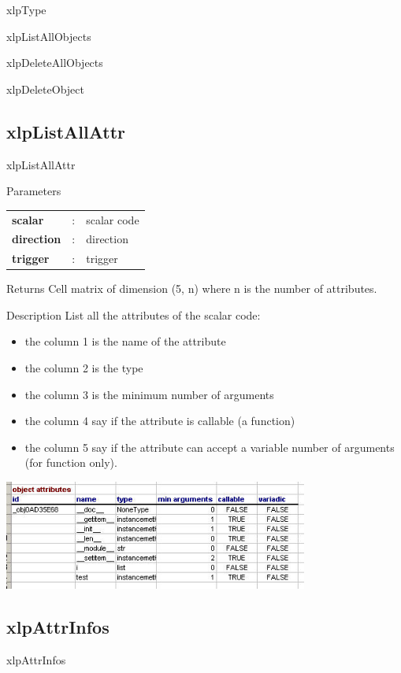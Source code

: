 \begin{xlpfunctitle}{xlpType}
\begin{xlpfunctitle}{xlpListAllObjects}
\begin{xlpfunctitle}{xlpDeleteAllObjects}
\begin{xlpfunctitle}{xlpDeleteObject}
\subsection{xlpListAllAttr}

\begin{xlpfunctitle}{xlpListAllAttr}

\begin{xlpfunc}{Parameters}
\begin{tabular}{p{3.5cm}cl}
\textbf{scalar}& : & scalar code \\
\textbf{direction}& : & direction \\
\textbf{trigger}& : & trigger 
\end{tabular}
\end{xlpfunc}


\begin{xlpfunc}{Returns}
Cell matrix of dimension (5, n) where n is the number of attributes.
\end{xlpfunc}

\begin{xlpfunc}{Description}
List all the attributes of the scalar code:
\begin{itemize}
\item the column 1 is the name of the attribute 
\item the column 2 is the type
\item the column 3 is the minimum number of arguments
\item the column 4 say if the attribute is callable (a function)
\item the column 5 say if the attribute can accept a variable number of arguments (for function only).
\end{itemize}
\includegraphics[width=10cm]{images/listallattr.jpg}
\end{xlpfunc}


\subsection{xlpAttrInfos}

\begin{xlpfunctitle}{xlpAttrInfos}


\end{xlpfunctitle}
\end{xlpfunctitle}
\end{xlpfunctitle}
\end{xlpfunctitle}
\end{xlpfunctitle}
\end{xlpfunctitle}
